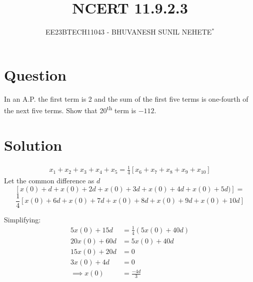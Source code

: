 \documentclass[journal,12pt,twocolumn]{IEEEtran}
\theoremstyle{remark}
\begin{document}

\vspace{3cm}

\title{NCERT 11.9.2.3}
\author{EE23BTECH11043 - BHUVANESH SUNIL NEHETE$^{*}$%
}
\maketitle
\newpage
\bigskip

\renewcommand{\thefigure}{\theenumi}
\renewcommand{\thetable}{\theenumi}



\section*{Question}

In an A.P. the first term is 2 and the sum of the first five terms is one-fourth of the next five terms. Show that 20\textsuperscript{th} term is $-112$.

\section*{Solution}

   \begin{align}
        x_1 + x_2 + x_3 + x_4 + x_5 = \frac{1}{4} [x_6 + x_7 + x_8 + x_9 + x_{10}]
    \end{align}
Let the common difference as \(d\)
\[[x(0) + d + x(0) + 2d + x(0) + 3d + x(0) + 4d + x(0) + 5d)] =\]
\[\frac{1}{4} [x(0) + 6d + x(0) + 7d + x(0) + 8d + x(0) + 9d + x(0) + 10d]\]

Simplifying:
    \begin{align}
        5x(0) + 15d &= \frac{1}{4}(5x(0) + 40d)\\
        20x(0) + 60d &= 5x(0) + 40d\\
        15x(0) + 20d &= 0\\
        3x(0) + 4d &= 0\\ 
        \implies x(0) &= \frac{-4d}{3}
    \end{align}
\end{document}
